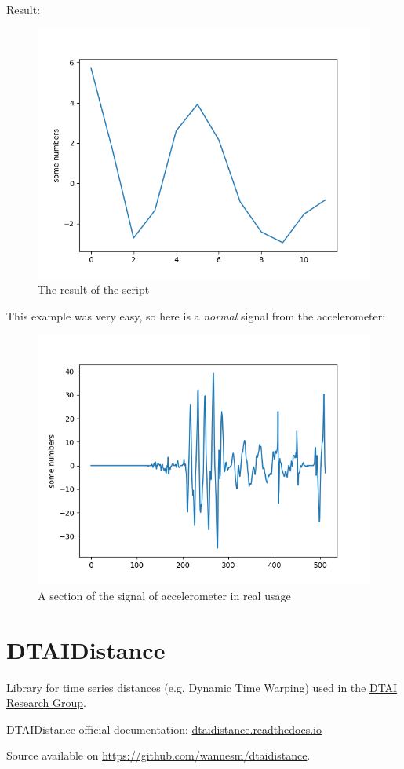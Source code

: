 \documentclass[12pt, a4paper, portrait]{article}
\begin{document}
Result:
\begin{figure}[ht]
\centering
\includegraphics[scale=0.87]{Figure_2.png}
\caption{The result of the script}
\end{figure}
\clearpage
This example was very easy, so here is a \textit{normal} signal from the accelerometer:
\begin{figure}[htp]
\centering
\includegraphics[scale=1.00]{Figure_1.png}
\caption{A section of the signal of accelerometer in real usage}
\end{figure}

\pagebreak
\section{DTAIDistance}
Library for time series distances (e.g. Dynamic Time Warping) used in the \href{https://dtai.cs.kuleuven.be/}{DTAI Research Group}.
\par
DTAIDistance official documentation: \href{https://dtaidistance.readthedocs.io/en/latest/index.html}{dtaidistance.readthedocs.io}
\par Source available on \url{https://github.com/wannesm/dtaidistance}.
\end{document}
